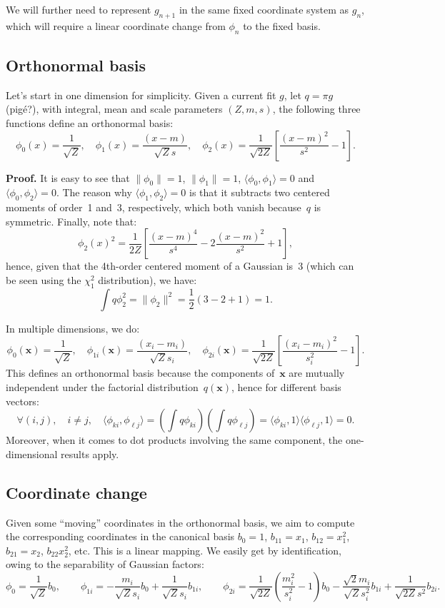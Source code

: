 \documentclass{article}
\def\x{\mathbf{x}}
\begin{document}
We will further need to represent $g_{n+1}$ in the same fixed coordinate system as $g_n$, which will require a linear coordinate change from $\phi_n$ to the fixed basis. 



\subsection{Orthonormal basis}

Let's start in one dimension for simplicity. Given a current fit $g$, let $q=\pi g$ (pig\'e?),  with integral, mean and scale parameters $(Z, m, s)$, the following three functions define an orthonormal basis:
$$
\phi_0(x) = \frac{1}{\sqrt{Z}},
\quad \phi_1(x) = \frac{(x-m)}{\sqrt{Z}s},
\quad \phi_2(x) = \frac{1}{\sqrt{2Z}}\left[\frac{(x-m)^2}{s^2} - 1\right].
$$

{\bf Proof.} It is easy to see that $\|\phi_0\|=1$, $\|\phi_1\|=1$, $\langle \phi_0, \phi_1 \rangle=0$ and $\langle \phi_0, \phi_2 \rangle=0$. The reason why $\langle \phi_1, \phi_2 \rangle=0$ is that it subtracts two centered moments of order~1 and~3, respectively, which both vanish because~$q$ is symmetric. Finally, note that:
$$
\phi_2(x)^2 = \frac{1}{2Z} 
\left[\frac{(x-m)^4}{s^4} - 2 \frac{(x-m)^2}{s^2} + 1 \right],
$$
hence, given that the 4th-order centered moment of a Gaussian is~3 (which can be seen using the $\chi_1^2$ distribution), we have:
$$
\int q \phi_2^2 = \|\phi_2\|^2 = \frac{1}{2} (3 - 2 + 1) = 1.
$$

In multiple dimensions, we do:
$$
\phi_0(\x) = \frac{1}{\sqrt{Z}}, 
\quad
\phi_{1i}(\x) = \frac{(x_i-m_i)}{\sqrt{Z} s_i},
\quad
\phi_{2i}(\x) = \frac{1}{\sqrt{2Z}}\left[\frac{(x_i-m_i)^2}{s_i^2} - 1\right].
$$
This defines an orthonormal basis because the components of~$\x$ are mutually independent under the factorial distribution~$q(\x)$, hence for different basis vectors: 
$$
\forall (i,j), \quad i\not= j, \quad
\langle \phi_{ki}, \phi_{\ell j} \rangle
= \left(\int q \phi_{ki}\right)\left(\int q \phi_{\ell j}\right)
= \langle \phi_{ki}, 1 \rangle \langle \phi_{\ell j}, 1 \rangle = 0.
$$
Moreover, when it comes to dot products involving the same component, the one-dimensional results apply.


\subsection{Coordinate change}

Given some ``moving'' coordinates in the orthonormal basis, we aim to compute the corresponding coordinates in the canonical basis $b_0=1$, $b_{11}=x_1$, $b_{12}=x_1^2$, $b_{21}=x_2$, $b_{22}x_2^2$, etc. This is a linear mapping. We easily get by identification, owing to the separability of Gaussian factors:
$$
\phi_0 =
\frac{1}{\sqrt{Z}} b_0,
\qquad
\phi_{1i} =
-\frac{m_i}{\sqrt{Z}s_i} b_0
+ \frac{1}{\sqrt{Z}s_i} b_{1i},
\qquad
\phi_{2i} =
\frac{1}{\sqrt{2Z}} \left(\frac{m_i^2}{s_i^2} - 1\right) b_0
- \frac{\sqrt{2}m_i}{\sqrt{Z}s_i^2} b_{1i}
+ \frac{1}{\sqrt{2Z}s^2} b_{2i}.
$$
\end{document}
